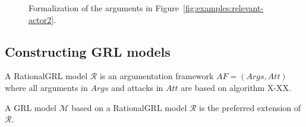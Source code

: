 \begin{figure}[ht!]
\centering
\caption{Formalization of the arguments in Figure~\ref{fig:examples:relevant-actor2}.}
\label{fig:examples:relevant-actor2:formal}
\end{figure}

\subsection{Constructing GRL models}
\label{sect:rationalGRL-GRL}

\begin{definition} A RationalGRL model $\mathcal{R}$ is an argumentation framework $AF=(Args,Att)$ where all arguments in $Args$ and attacks in $Att$ are based on algorithm X-XX.  
\end{definition}

\begin{definition} A GRL model $\mathcal{M}$ based on a RationalGRL model $\mathcal{R}$ is the preferred extension of $\mathcal{R}$.  
\end{definition}

